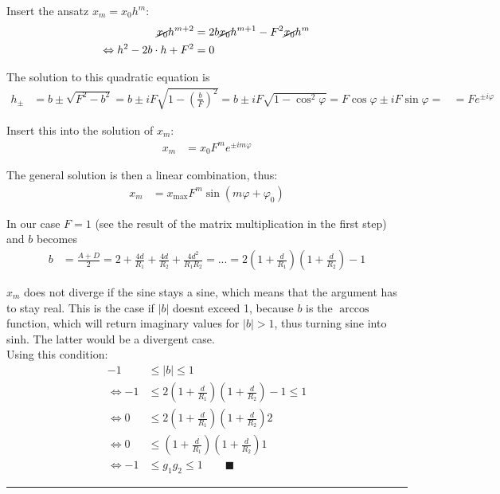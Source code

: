 \documentclass{article}
\newcommand{\lr}[1]{\left(#1\right)}
\begin{document}
{	Insert the ansatz $x_m = x_0 h^m$:
		\begin{align*}
			\cancel{x_0} h^{m+2} &= 2b \cancel{x_0} h^{m+1} - F^2 \cancel{x_0} h^m \\
			\Leftrightarrow h^2 - 2b \cdot h + F^2 &= 0
		\end{align*}


\newpage


	The solution to this quadratic equation is
		\begin{align*}
			h_\pm &= b \pm \sqrt{F^2 - b^2} = b \pm i F \sqrt{ 1 - \lr{ \frac{b}{F} }^2 } = b \pm i F \sqrt{ 1 - \cos^2\varphi } = F\cos\varphi \pm i F \sin\varphi =  
			&= F e^{\pm i \varphi}
		\end{align*}
	
	Insert this into the solution of $x_m$:
		\begin{align*}
			x_m &= x_0 F^m e^{\pm i m \varphi}
		\end{align*}
	
	The general solution is then a linear combination, thus:
		\begin{align*}
			x_m &= x_\text{max} F^m \sin(m\varphi + \varphi_0)
		\end{align*}
		
	In our case $F=1$ \textcolor{gruen}{(see the result of the matrix multiplication in the first step)} and $b$ becomes
		\begin{align*}
			b &= \frac{A+D}{2} = 2 + \frac{4d}{R_1} + \frac{4d}{R_2} + \frac{4d^2}{R_1R_2} = ...  = 2 \lr{ 1 + \frac{d}{R_1} } \lr{ 1 + \frac{d}{R_2} } - 1
		\end{align*}
	
	$x_m$ does not diverge if the sine stays a sine, which means that the argument has to stay real. This is the case if $|b|$ doesnt exceed 1, because $b$ is the $\arccos$ function, which will return imaginary values for $|b|>1$, thus turning sine into sinh. The latter would be a divergent case.\\
	Using this condition:
		\begin{align*}
			-1 &\leq |b| \leq 1 \\
			\Leftrightarrow -1 &\leq 2 \lr{ 1 + \frac{d}{R_1} } \lr{ 1 + \frac{d}{R_2} } - 1 \leq 1 \\
			\Leftrightarrow 0 &\leq 2 \lr{ 1 + \frac{d}{R_1} } \lr{ 1 + \frac{d}{R_2} } 2 \\
			\Leftrightarrow 0 &\leq \lr{ 1 + \frac{d}{R_1} } \lr{ 1 + \frac{d}{R_2} } 1 \\
			\Leftrightarrow -1 &\leq g_1 g_2 \leq 1 \qquad \blacksquare
		\end{align*}
\hrule
}
\end{document}
